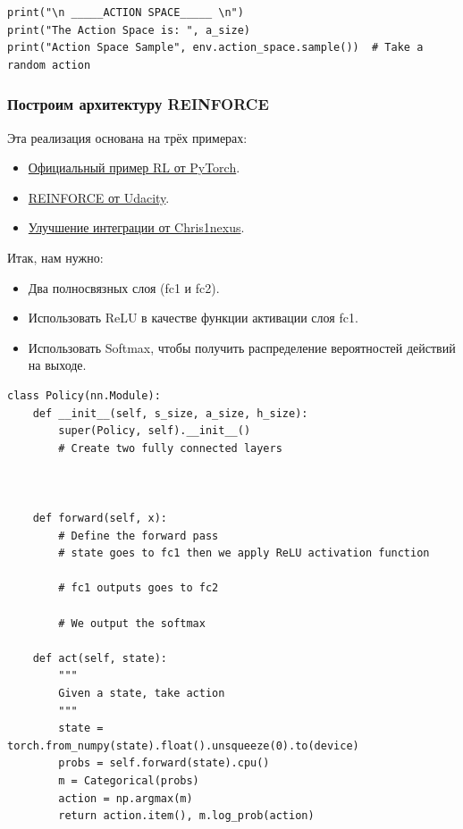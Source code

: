 \documentclass[11pt,a4paper]{article}
\begin{document}
\begin{lstlisting}
print("\n _____ACTION SPACE_____ \n")
print("The Action Space is: ", a_size)
print("Action Space Sample", env.action_space.sample())  # Take a random action
\end{lstlisting}

\subsubsection{Построим архитектуру REINFORCE}\label{lets-build-the-reinforce-architecture}

Эта реализация основана на трёх примерах:

\begin{itemize}
\tightlist
\item
  \href{https://github.com/pytorch/examples/blob/main/reinforcement_learning/reinforce.py}{Официальный пример RL от PyTorch}.
\item
  \href{https://github.com/udacity/deep-reinforcement-learning/blob/master/reinforce/REINFORCE.ipynb}{REINFORCE от Udacity}.
\item
  \href{https://github.com/huggingface/deep-rl-class/pull/95}{Улучшение интеграции от Chris1nexus}.
\end{itemize}


Итак, нам нужно:

\begin{itemize}
\tightlist
\item
  Два полносвязных слоя (fc1 и fc2).
\item
  Использовать ReLU в качестве функции активации слоя fc1.
\item
  Использовать Softmax, чтобы получить распределение вероятностей действий на выходе.
\end{itemize}

\begin{lstlisting}
class Policy(nn.Module):
    def __init__(self, s_size, a_size, h_size):
        super(Policy, self).__init__()
        # Create two fully connected layers



    def forward(self, x):
        # Define the forward pass
        # state goes to fc1 then we apply ReLU activation function

        # fc1 outputs goes to fc2

        # We output the softmax

    def act(self, state):
        """
        Given a state, take action
        """
        state = torch.from_numpy(state).float().unsqueeze(0).to(device)
        probs = self.forward(state).cpu()
        m = Categorical(probs)
        action = np.argmax(m)
        return action.item(), m.log_prob(action)
\end{lstlisting}
\end{document}

